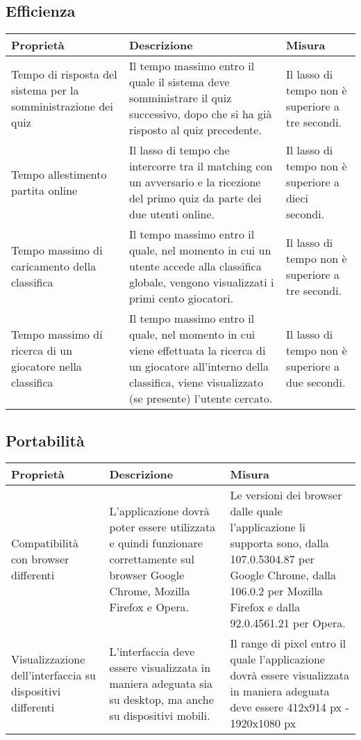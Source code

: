 \subsection{Efficienza}
\begin{tabularx}{\textwidth}{ |X |X| X|}
    \hline
    \textbf{Proprietà} & \textbf{Descrizione} & \textbf{Misura} \\
    \hline
    Tempo di risposta del sistema per la somministrazione dei quiz & Il tempo massimo entro il quale il sistema deve somministrare il quiz successivo, dopo che si ha già risposto al quiz precedente. & Il lasso di tempo non è superiore a tre secondi.\\
    \hline
    Tempo allestimento partita online & Il lasso di tempo che intercorre tra il matching con un avversario e la ricezione del primo quiz da parte dei due utenti online. & Il lasso di tempo non è superiore a dieci secondi. \\
    \hline
    Tempo massimo di caricamento della classifica & Il tempo massimo entro il quale, nel momento in cui un utente accede alla classifica globale, vengono visualizzati i primi cento giocatori. & Il lasso di tempo non è superiore a tre secondi. \\
    \hline
    Tempo massimo di ricerca di un giocatore nella classifica & Il tempo massimo entro il quale, nel momento in cui viene effettuata la ricerca di un giocatore all'interno della classifica, viene visualizzato (se presente) l'utente cercato. & Il lasso di tempo non è superiore a due secondi. \\
    \hline
\end{tabularx}

\subsection{Portabilità}
\begin{tabularx}{\textwidth}{ |X |X| X|}
    \hline
    \textbf{Proprietà} & \textbf{Descrizione} & \textbf{Misura} \\
    \hline
    Compatibilità con browser differenti & L'applicazione dovrà poter essere utilizzata e quindi funzionare correttamente sul browser Google Chrome, Mozilla Firefox e Opera.
    & Le versioni dei browser dalle quale l'applicazione li supporta sono, dalla 107.0.5304.87 per Google Chrome, dalla 106.0.2 per Mozilla Firefox e dalla 92.0.4561.21 per Opera.\\
    \hline
    Visualizzazione dell'interfaccia su dispositivi differenti & L’interfaccia deve essere visualizzata in maniera adeguata sia su desktop, ma anche su dispositivi mobili. 
    & Il range di pixel entro il quale l'applicazione dovrà essere visualizzata in maniera adeguata deve essere 412x914 px - 1920x1080 px \\
    \hline
\end{tabularx}

